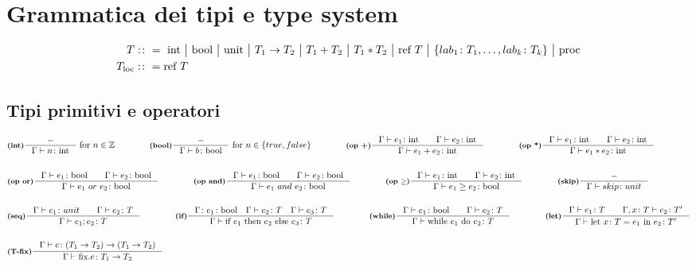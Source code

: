 \documentclass[a4paper, 10pt]{article}
\newcommand{\numberset}{\mathbb}
\newcommand{\Z}{\numberset{Z}}
\newcommand{\integer}{\textup{int}}
\newcommand{\bool}{\textup{bool}}
\newcommand{\infer}[4]{\inference[\textbf{#1}]{#2}{#3}#4 }
\begin{document}
\section*{Grammatica dei tipi e type system}
\vspace{-.5cm}
\begin{minipage}{.45\linewidth}
	\begin{flushleft}
	\begin{align*}
		T&:\colon=\ \integer\ \big|\ \bool\ \big|\ \textup{unit}\ \big|\ T_1\rightarrow T_2\ \big|\ T_1 + T_2\ \big|\ T_1 * T_2\ 
		\big|\ \textup{ref}\ T\ \big|\ \{lab_1\colon T_1, \dots, lab_k\colon T_k \}\ \big|\ \text{proc} \\
		T_{\text{loc}}&:\colon = \text{ref } T
	\end{align*}	
	\vspace{-1cm}
\subsection*{Tipi primitivi e operatori}
	\begin{align*}
		&\infer{(int)}{-}{\Gamma \vdash n\colon \integer}{\ \textup{for}\ n \in \Z} \qquad\qquad
		\infer{(bool)}{-}{\Gamma \vdash b\colon \bool}{\ \textup{for}\ n \in \{true, false\}} \qquad\qquad
		\infer{(op +)}{\Gamma \vdash e_1\colon \integer\qquad \Gamma \vdash e_2\colon \integer}{\Gamma\vdash e_1 + e_2 \colon \integer}{}\qquad\qquad
		\infer{(op *)}{\Gamma \vdash e_1\colon \integer\qquad \Gamma \vdash e_2\colon \integer}{\Gamma\vdash e_1 * e_2 \colon \integer}{} \\ \\
		&\infer{(op or)}{\Gamma\vdash e_1\colon \bool\qquad \Gamma\vdash e_2\colon\bool}{\Gamma\vdash e_1\ or\ e_2 \colon\bool}{}\qquad\qquad
		\infer{(op and)}{\Gamma\vdash e_1\colon \bool\qquad \Gamma\vdash e_2\colon\bool}{\Gamma\vdash e_1\ and\ e_2 \colon\bool}{} \qquad\qquad
		\infer{(op $ \geq $)}{\Gamma \vdash e_1\colon \integer\qquad \Gamma \vdash e_2\colon \integer}{\Gamma\vdash e_1 \geq e_2 \colon \bool}{}\qquad\qquad
		\infer{(skip)}{-}{\Gamma\vdash skip\colon unit}{}\\ \\
		&\infer{(seq)}{\Gamma \vdash e_1\colon unit \qquad \Gamma\vdash e_2\colon T}{\Gamma \vdash e_1;e_2\colon T}{}\qquad\qquad
		\infer{(if)}{\Gamma\colon e_1\colon\bool\quad\Gamma\vdash e_2\colon T\quad \Gamma\vdash e_3 \colon T}{\Gamma\vdash \textup{if}\ e_1\ \textup{then}\ e_2\ \textup{else}\ e_3\colon T }{} \qquad\qquad
		\infer{(while)}{\Gamma\vdash e_1 \colon \bool\qquad \Gamma\vdash e_2 \colon T}{\Gamma \vdash\textup{while}\ e_1\ \textup{do}\ e_2\colon T}{}\qquad\qquad
		\infer{(let)}{\Gamma \vdash e_1\colon T\qquad \Gamma,x\colon T \vdash e_2\colon T'}{
			\Gamma\vdash \textup{let}\ x\colon T = e_1\ \textup{in}\ e_2\colon T'}{} \\ \\
		&\infer{(T-fix)}{\Gamma\vdash e\colon (T_1\rightarrow T_2)\rightarrow(T_1\rightarrow T_2)}{\Gamma\vdash \text{fix}.e\colon T_1\rightarrow T_2}{}
	\end{align*}

\end{flushleft}
\end{minipage}
\end{document}
